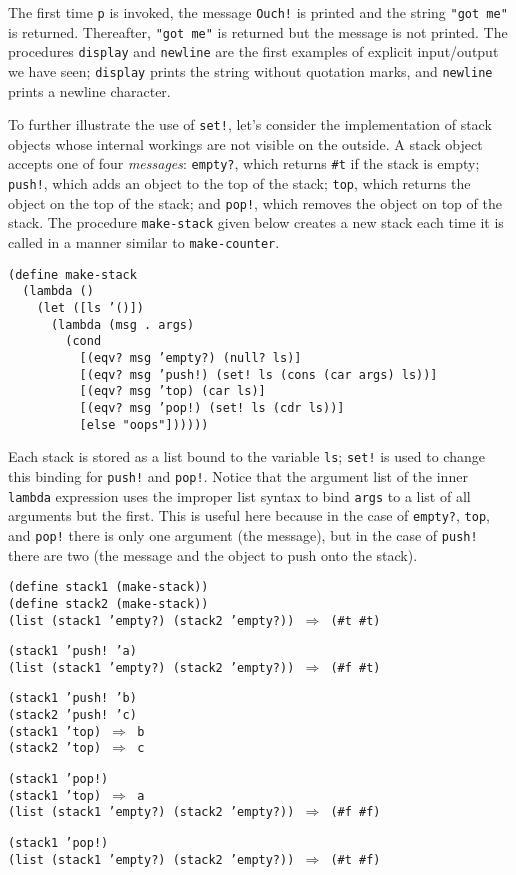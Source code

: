 The first time \texttt{p} is invoked, the message \texttt{Ouch!} is printed
and the string \texttt{"got me"} is returned.
Thereafter, \texttt{"got me"} is returned but the message is not printed.
The procedures \texttt{display} and \texttt{newline} are the first examples
of explicit input/output we have seen; \texttt{display} prints the string
without quotation marks, and \texttt{newline} prints a newline character.


To further illustrate the use of \texttt{set!},
let's consider the implementation of \label{start_s176}stack objects whose
internal workings are not visible on the outside.
A stack object accepts one of four \label{start_s177}\textit{messages}: \texttt{empty?}, which
returns \texttt{\#{}t} if the stack is empty; \texttt{push!}, which adds an object
to the top of the stack; \texttt{top}, which returns the object on the top of
the stack; and \texttt{pop!}, which removes the object on top of the stack.
The procedure \label{start_s178}\texttt{make-stack} given below creates a new stack each time
it is called in a manner similar to \texttt{make-counter}.


\begin{alltt}
(define make-stack
  (lambda ()
    (let ([ls '()])
      (lambda (msg . args)
        (cond
          [(eqv? msg 'empty?) (null? ls)]
          [(eqv? msg 'push!) (set! ls (cons (car args) ls))]
          [(eqv? msg 'top) (car ls)]
          [(eqv? msg 'pop!) (set! ls (cdr ls))]
          [else "oops"])))))
\end{alltt}


Each stack is stored as a list bound to the variable \texttt{ls}; \texttt{set!}
is used to change this binding for \texttt{push!} and \texttt{pop!}.
Notice that the argument list of the inner \texttt{lambda} expression uses the
improper list syntax to bind \texttt{args} to a list of all arguments but the
first.
This is useful here because in the case of \texttt{empty?}, \texttt{top}, and
\texttt{pop!} there is only one argument (the message), but in the case of
\texttt{push!} there are two (the message and the object to push onto the
stack).


\begin{alltt}
(define stack1 (make-stack))
(define stack2 (make-stack))
(list (stack1 'empty?) (stack2 'empty?)) \(\Rightarrow\) (\#{}t \#{}t)

(stack1 'push! 'a)
(list (stack1 'empty?) (stack2 'empty?)) \(\Rightarrow\) (\#{}f \#{}t)

(stack1 'push! 'b)
(stack2 'push! 'c)
(stack1 'top) \(\Rightarrow\) b
(stack2 'top) \(\Rightarrow\) c

(stack1 'pop!)
(stack1 'top) \(\Rightarrow\) a
(list (stack1 'empty?) (stack2 'empty?)) \(\Rightarrow\) (\#{}f \#{}f)

(stack1 'pop!)
(list (stack1 'empty?) (stack2 'empty?)) \(\Rightarrow\) (\#{}t \#{}f)
\end{alltt}


